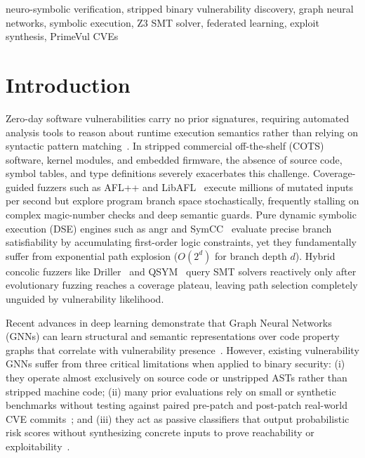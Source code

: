 \documentclass[10pt,conference]{IEEEtran}
\begin{document}
\begin{IEEEkeywords}
neuro-symbolic verification, stripped binary vulnerability discovery, graph neural networks, symbolic execution, Z3 SMT solver,
federated learning, exploit synthesis, PrimeVul CVEs
\end{IEEEkeywords}

\section{Introduction}

Zero-day software vulnerabilities carry no prior signatures, requiring automated analysis tools to reason about runtime execution
semantics rather than relying on syntactic pattern matching~\cite{berrios2025zeroday}. In stripped commercial off-the-shelf (COTS)
software, kernel modules, and embedded firmware, the absence of source code, symbol tables, and type definitions severely exacerbates
this challenge. Coverage-guided fuzzers such as AFL++ and LibAFL~\cite{fioraldi2022libafl} execute millions of mutated inputs per second
but explore program branch space stochastically, frequently stalling on complex magic-number checks and deep semantic guards. Pure
dynamic symbolic execution (DSE) engines such as angr and SymCC~\cite{poeplau2020symcc} evaluate precise branch satisfiability by
accumulating first-order logic constraints, yet they fundamentally suffer from exponential path explosion ($O(2^d)$ for branch
depth $d$). Hybrid concolic fuzzers like Driller~\cite{stephens2016driller} and QSYM~\cite{yun2018qsym} query SMT solvers reactively
only after evolutionary fuzzing reaches a coverage plateau, leaving path selection completely unguided by vulnerability likelihood.

Recent advances in deep learning demonstrate that Graph Neural Networks (GNNs) can learn structural and semantic representations
over code property graphs that correlate with vulnerability presence~\cite{sun2026gnnse,wang2023deepvulseeker,jia2025graphspd,zhang2026gnn}.
However, existing vulnerability GNNs suffer from three critical limitations when applied to binary security: (i) they operate almost
exclusively on source code or unstripped ASTs rather than stripped machine code; (ii) many prior evaluations rely on small or synthetic
benchmarks without testing against paired pre-patch and post-patch real-world CVE commits~\cite{ding2024primevul}; and (iii) they act as
passive classifiers that output probabilistic risk scores without synthesizing concrete inputs to prove reachability or exploitability~\cite{malkawi2026ai,neurosymbolic2025}.
\end{document}
